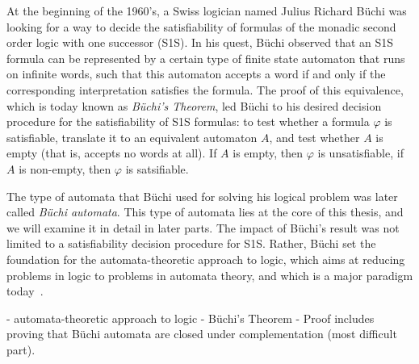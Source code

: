At the beginning of the 1960's, a Swiss logician named Julius Richard Büchi was looking for a way to decide the satisfiability of formulas of the monadic second order logic with one successor (S1S). In his quest, Büchi observed that an S1S formula can be represented by a certain type of finite state automaton that runs on infinite words, such that this automaton accepts a word if and only if the corresponding interpretation satisfies the formula. The proof of this equivalence, which is today known as \textit{Büchi's Theorem}, led Büchi to his desired decision procedure for the satisfiability of S1S formulas: to test whether a formula $\varphi$ is satisfiable, translate it to an equivalent automaton $A$, and test whether $A$ is empty (that is, accepts no words at all). If $A$ is empty, then $\varphi$ is unsatisfiable, if $A$ is non-empty, then $\varphi$ is satsifiable.~\cite{buchi1960decision}

The type of automata that Büchi used for solving his logical problem was later called \textit{Büchi automata}. This type of automata lies at the core of this thesis, and we will examine it in detail in later parts. The impact of Büchi's result was not limited to a satisfiability decision procedure for S1S. Rather, Büchi set the foundation for the automata-theoretic approach to logic, which aims at reducing problems in logic to problems in automata theory, and which is a major paradigm today~\cite{vardi2007automata}. 


- automata-theoretic approach to logic
- Büchi's Theorem
  - Proof includes proving that Büchi automata are closed under complementation (most difficult part).




